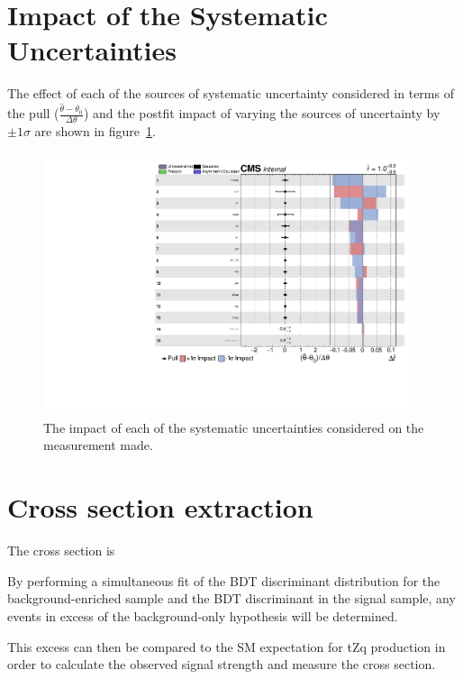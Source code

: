 \section{Impact of the Systematic Uncertainties}\label{sec:uncertainitiesImpact}
The effect of each of the sources of systematic uncertainty considered in terms of the pull ($\frac{ \hat{\theta} - \theta_{0} }{\Delta \theta}$) and the postfit impact of varying the sources of uncertainty by $\pm 1 \sigma$ are shown in figure~\ref{fig:systematicsPull}.


\begin{figure}[htbp]
\begin{center}
\includegraphics[width=0.97\textwidth]{figs/results/systematicsImpact.pdf}
\caption{The impact of each of the systematic uncertainties considered on the measurement made.}
\label{fig:systematicsPull}
\end{center}
\end{figure}

\section{Cross section extraction}
The cross section is 

By performing a simultaneous fit of the BDT discriminant distribution for the background-enriched sample and the BDT discriminant in the signal sample, any events in excess of the background-only hypothesis will be determined.

This excess can then be compared to the SM expectation for tZq production in order to calculate the observed signal strength and measure the cross section.

